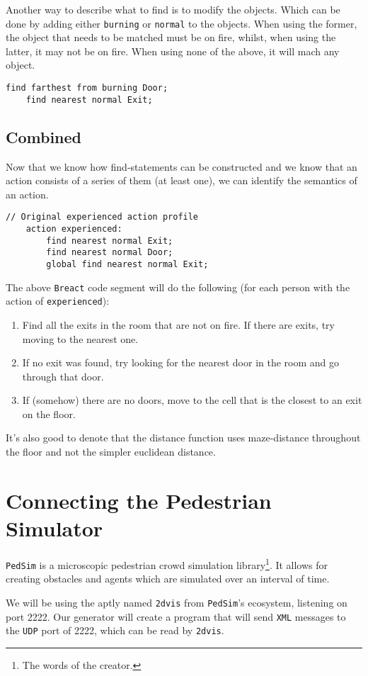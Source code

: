 \documentclass[review]{elsarticle}
\begin{document}
Another way to describe what to find is to modify the objects. Which can be done by adding either \texttt{burning} or \texttt{normal} to the objects. When using the former, the object that needs to be matched must be on fire, whilst, when using the latter, it may not be on fire. When using none of the above, it will mach any object.
\begin{lstlisting}[language=Breact]
	find farthest from burning Door;
	find nearest normal Exit;
\end{lstlisting}

\subsection{Combined}
Now that we know how find-statements can be constructed and we know that an action consists of a series of them (at least one), we can identify the semantics of an action.
\begin{lstlisting}[language=Breact]
	// Original experienced action profile	
	action experienced:
		find nearest normal Exit;
		find nearest normal Door;
		global find nearest normal Exit; 
\end{lstlisting}
The above \texttt{Breact} code segment will do the following (for each person with the action of \texttt{experienced}):
\begin{enumerate}
	\item Find all the exits in the room that are not on fire. If there are exits, try moving to the nearest one.
	\item If no exit was found, try looking for the nearest door in the room and go through that door.
	\item If (somehow) there are no doors, move to the cell that is the closest to an exit on the floor.
\end{enumerate}
It's also good to denote that the distance function uses maze-distance throughout the floor and not the simpler euclidean distance.


\section{Connecting the Pedestrian Simulator}
\label{sec:pedsim}
\texttt{PedSim} is a \textsf{microscopic pedestrian crowd simulation library}\footnote{The words of the creator.}. It allows for creating obstacles and agents which are simulated over an interval of time. \cite{pedsim}

We will be using the aptly named \texttt{2dvis} from \texttt{PedSim}'s \textsf{ecosystem}, listening on port 2222. Our generator will create a program that will send \texttt{XML} messages to the \texttt{UDP} port of 2222, which can be read by \texttt{2dvis}.
\end{document}
